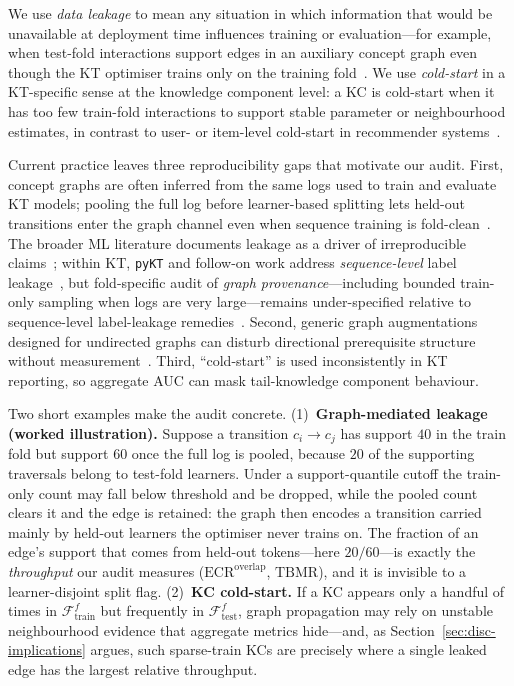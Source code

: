 \documentclass[pdflatex,sn-mathphys-num]{sn-jnl}
\newcommand{\KC}{knowledge component}
\begin{document}
We use \emph{data leakage} to mean any situation in which information
that would be unavailable at deployment time influences training or
evaluation---for example, when test-fold interactions support edges in
an auxiliary concept graph even though the KT optimiser trains only on
the training fold~\cite{kaufman2012leakage,kapoor2023leakage}. We use
\emph{cold-start} in a KT-specific sense at the \KC{} level: a KC is
cold-start when it has too few train-fold interactions to support stable
parameter or neighbourhood estimates, in contrast to user- or item-level
cold-start in recommender systems~\cite{schein2002coldstart}.

Current practice leaves three reproducibility gaps that motivate our
audit. First, concept graphs are often inferred from the same logs used
to train and evaluate KT models; pooling the full log before
learner-based splitting lets held-out transitions enter the graph
channel even when sequence training is fold-clean~\cite{nakagawa2019gkt,tong2020skt,liu2022pykt}.
The broader ML literature documents leakage as a driver of irreproducible
claims~\cite{kaufman2012leakage,kapoor2023leakage}; within KT,
\texttt{pyKT} and follow-on work address \emph{sequence-level} label
leakage~\cite{liu2022pykt,badran2024labelleakage}, but fold-specific
audit of \emph{graph provenance}---including bounded train-only sampling
when logs are very large---remains under-specified relative to sequence-level
label-leakage remedies~\cite{badran2024labelleakage}. Second, generic graph
augmentations designed for undirected graphs can disturb directional
prerequisite structure without measurement~\cite{you2020graphcl,zhu2021gca}.
Third, ``cold-start'' is used inconsistently in KT reporting, so
aggregate AUC can mask tail-\KC{} behaviour.

Two short examples make the audit concrete. (1)~\textbf{Graph-mediated
leakage (worked illustration).} Suppose a transition $c_i\!\to\!c_j$ has
support $40$ in the train fold but support $60$ once the full log is pooled,
because $20$ of the supporting traversals belong to test-fold learners. Under
a support-quantile cutoff the train-only count may fall below threshold and be
dropped, while the pooled count clears it and the edge is retained: the graph
then encodes a transition carried mainly by held-out learners the optimiser
never trains on. The fraction of an edge's support that comes from held-out
tokens---here $20/60$---is exactly the \emph{throughput} our audit measures
($\mathrm{ECR}^{\mathrm{overlap}}$, $\mathrm{TBMR}$), and it is invisible to a
learner-disjoint split flag. (2)~\textbf{KC cold-start.} If a KC appears only a
handful of times in $\mathcal{F}_{\text{train}}^f$ but frequently in
$\mathcal{F}_{\text{test}}^f$, graph propagation may rely on unstable
neighbourhood evidence that aggregate metrics hide---and, as
Section~\ref{sec:disc-implications} argues, such sparse-train KCs are precisely
where a single leaked edge has the largest relative throughput.
\end{document}
